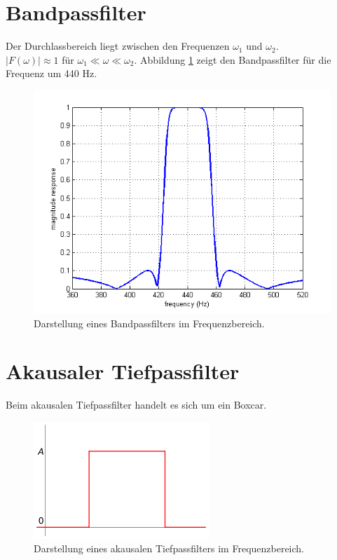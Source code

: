 \section{Bandpassfilter}
Der Durchlassbereich liegt zwischen den Frequenzen $\omega_{1}$ und $\omega_{2}$. \\
$\vert F(\omega) \vert \approx 1 $ für $\omega_{1} \ll\omega \ll\omega_{2}$. Abbildung \ref{fig:filt_bandpass} zeigt den Bandpassfilter für die Frequenz um 440 Hz. 
\begin{figure}[h!]
\centering
\includegraphics[width=.6\tw]{fig/06-Filter/bandpass.png}
\caption{Darstellung eines Bandpassfilters im Frequenzbereich.}
\label{fig:filt_bandpass}
\end{figure}

\section{Akausaler Tiefpassfilter}
Beim akausalen Tiefpassfilter handelt es sich um ein Boxcar. 
\begin{figure}[h!]
\centering
\includegraphics[width=.6\tw]{fig/06-Filter/boxcar.png}
\caption{Darstellung eines akausalen Tiefpassfilters im Frequenzbereich.}
\end{figure}